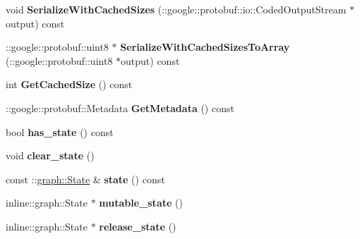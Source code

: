 \begin{DoxyCompactItemize}
\item 
\hypertarget{classgraph_1_1NodeStatePotential_a31c56a9c6685e3ebfccf1b20d6126818}{
void {\bfseries SerializeWithCachedSizes} (::google::protobuf::io::CodedOutputStream $\ast$output) const }
\label{classgraph_1_1NodeStatePotential_a31c56a9c6685e3ebfccf1b20d6126818}

\item 
\hypertarget{classgraph_1_1NodeStatePotential_a6ec1fd079d7e4ba59d85aadb77b153a5}{
::google::protobuf::uint8 $\ast$ {\bfseries SerializeWithCachedSizesToArray} (::google::protobuf::uint8 $\ast$output) const }
\label{classgraph_1_1NodeStatePotential_a6ec1fd079d7e4ba59d85aadb77b153a5}

\item 
\hypertarget{classgraph_1_1NodeStatePotential_aed31dd680aeefcc638f69aed20feaa89}{
int {\bfseries GetCachedSize} () const }
\label{classgraph_1_1NodeStatePotential_aed31dd680aeefcc638f69aed20feaa89}

\item 
\hypertarget{classgraph_1_1NodeStatePotential_a9d32e1f4f52612fb611c3cca90461266}{
::google::protobuf::Metadata {\bfseries GetMetadata} () const }
\label{classgraph_1_1NodeStatePotential_a9d32e1f4f52612fb611c3cca90461266}

\item 
\hypertarget{classgraph_1_1NodeStatePotential_a360c4a144fbf3d177d98617b5b680917}{
bool {\bfseries has\_\-state} () const }
\label{classgraph_1_1NodeStatePotential_a360c4a144fbf3d177d98617b5b680917}

\item 
\hypertarget{classgraph_1_1NodeStatePotential_aa742b7c0f5560b3ef8d9a611681cf73f}{
void {\bfseries clear\_\-state} ()}
\label{classgraph_1_1NodeStatePotential_aa742b7c0f5560b3ef8d9a611681cf73f}

\item 
\hypertarget{classgraph_1_1NodeStatePotential_aa4662ec90fdc85d9d5eef76b8513ba40}{
const ::\hyperlink{classgraph_1_1State}{graph::State} \& {\bfseries state} () const }
\label{classgraph_1_1NodeStatePotential_aa4662ec90fdc85d9d5eef76b8513ba40}

\item 
\hypertarget{classgraph_1_1NodeStatePotential_a70ac4460fc2c550288b8471d9edddd24}{
inline::graph::State $\ast$ {\bfseries mutable\_\-state} ()}
\label{classgraph_1_1NodeStatePotential_a70ac4460fc2c550288b8471d9edddd24}

\item 
\hypertarget{classgraph_1_1NodeStatePotential_aea68f8c3b4d98f01ac816b5b452ef726}{
inline::graph::State $\ast$ {\bfseries release\_\-state} ()}
\label{classgraph_1_1NodeStatePotential_aea68f8c3b4d98f01ac816b5b452ef726}


\end{DoxyCompactItemize}
